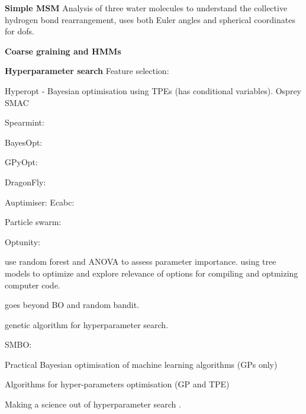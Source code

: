 \textbf{Simple MSM}
Analysis of three water molecules \cite{schulzCollectiveHydrogenbondRearrangement2018} to understand the collective hydrogen bond rearrangement, uses both Euler angles and spherical coordinates for dofs. 








\textbf{Coarse graining and HMMs}


\textbf{Hyperparameter search}
Feature selection: \cite{schererVariationalSelectionFeatures2019}


\cite{bergstraHyperoptPythonLibrary2013} Hyperopt - Bayesian optimisation using TPEs (has conditional variables). 
\cite{mcgibbonOspreyHyperparameterOptimization2016a} Osprey
\cite{hutterSequentialModelbasedOptimization2011} SMAC

Spearmint: \cite{DBLP:conf/uai/GelbartSA14}\cite{snoekAbstractBayesianOptimization2013}\cite{snoekInputWarpingBayesian2014a}\cite{NIPS2013_5086}\cite{NIPS2012_4522}

BayesOpt: \cite{martinez-cantinBayesOptBayesianOptimization2014}

GPyOpt: \cite{gpyopt2016}

DragonFly: \cite{JMLR:v21:18-223}

Auptimiser: \cite{liuAuptimizerExtensibleOpenSource2019}
Ecabc: \cite{Sharma2019}

Particle swarm: \cite{lorenzo2017particle}

Optunity: \cite{claesenEasyHyperparameterSearch2014}

\cite{pmlr-v32-hutter14} use random forest and ANOVA to assess parameter importance. 
\cite{gramacyVariableSelectionSensitivity2013} using tree models to optimize and explore relevance of options for compiling and optmizing computer code. 

\cite{falknerBOHBRobustEfficient2018a} goes beyond BO and random bandit. 

\cite{di2018genetic} genetic algorithm for hyperparameter search. 

SMBO: \cite{hutterSequentialModelbasedOptimization2011}

Practical Bayesian optimisation of machine learning algorithms \cite{NIPS2012_4522} (GPs only)

Algorithms for hyper-parameters optimisation \cite{bergstraAlgorithmsHyperParameterOptimizationa} (GP and TPE)

Making a science out of hyperparameter search \cite{bergstraMakingScienceModel2013}. 




















